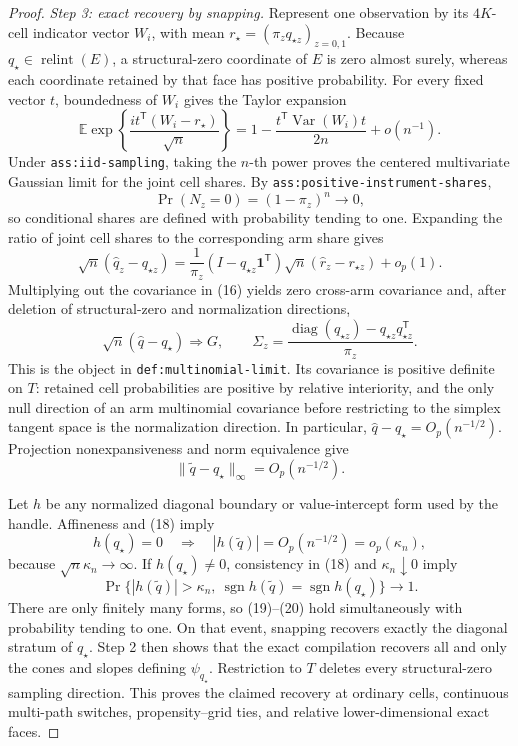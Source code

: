 \documentclass{article}
\begin{document}
\begin{proof}
\emph{Step 3: exact recovery by snapping.}
Represent one observation by its \(4K\)-cell indicator vector \(W_i\), with mean \(r_\star=(\pi_zq_{\star z})_{z=0,1}\).  Because \(q_\star\in\operatorname{relint}(E)\), a structural-zero coordinate of \(E\) is zero almost surely, whereas each coordinate retained by that face has positive probability.  For every fixed vector \(t\), boundedness of \(W_i\) gives the Taylor expansion
\[
 \mathbb E\exp\!\left\{\frac{i t^{\mathsf T}(W_i-r_\star)}{\sqrt n}\right\}
 =1-\frac{t^{\mathsf T}\operatorname{Var}(W_i)t}{2n}+o(n^{-1}).
\tag{14}
\]
Under \texttt{ass:iid-sampling}, taking the \(n\)-th power proves the centered multivariate Gaussian limit for the joint cell shares.  By \texttt{ass:positive-instrument-shares},
\[
 \Pr(N_z=0)=(1-\pi_z)^n\longrightarrow0,
\tag{15}
\]
so conditional shares are defined with probability tending to one.  Expanding the ratio of joint cell shares to the corresponding arm share gives
\[
 \sqrt n(\widehat q_z-q_{\star z})
 =\frac{1}{\pi_z}
  (I-q_{\star z}\mathbf 1^{\mathsf T})
  \sqrt n(\widehat r_z-r_{\star z})+o_p(1).
\tag{16}
\]
Multiplying out the covariance in (16) yields zero cross-arm covariance and, after deletion of structural-zero and normalization directions,
\[
 \sqrt n(\widehat q-q_\star)\Rightarrow G,
 \qquad
 \Sigma_z=\frac{\operatorname{diag}(q_{\star z})
                  -q_{\star z}q_{\star z}^{\mathsf T}}{\pi_z}.
\tag{17}
\]
This is the object in \texttt{def:multinomial-limit}.  Its covariance is positive definite on \(T\): retained cell probabilities are positive by relative interiority, and the only null direction of an arm multinomial covariance before restricting to the simplex tangent space is the normalization direction.  In particular, \(\widehat q-q_\star=O_p(n^{-1/2})\).  Projection nonexpansiveness and norm equivalence give
\[
 \|\widetilde q-q_\star\|_\infty
 =O_p(n^{-1/2}).
\tag{18}
\]

Let \(h\) be any normalized diagonal boundary or value-intercept form used by the handle.  Affineness and (18) imply
\[
 h(q_\star)=0
 \quad\Longrightarrow\quad
 |h(\widetilde q)|=O_p(n^{-1/2})=o_p(\kappa_n),
\tag{19}
\]
because \(\sqrt n\kappa_n\to\infty\).  If \(h(q_\star)\neq0\), consistency in (18) and \(\kappa_n\downarrow0\) imply
\[
 \Pr\{|h(\widetilde q)|>\kappa_n,\ 
 \operatorname{sgn}h(\widetilde q)=\operatorname{sgn}h(q_\star)\}
 \longrightarrow1.
\tag{20}
\]
There are only finitely many forms, so (19)--(20) hold simultaneously with probability tending to one.  On that event, snapping recovers exactly the diagonal stratum of \(q_\star\).  Step 2 then shows that the exact compilation recovers all and only the cones and slopes defining \(\psi_{q_\star}\).  Restriction to \(T\) deletes every structural-zero sampling direction.  This proves the claimed recovery at ordinary cells, continuous multi-path switches, propensity--grid ties, and relative lower-dimensional exact faces.


\end{proof}
\end{document}
